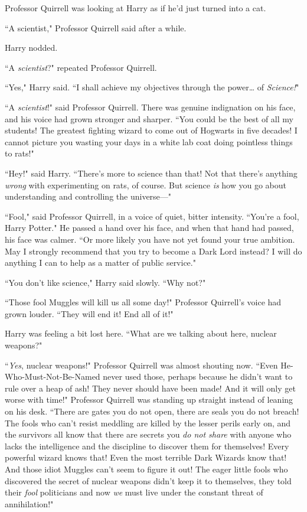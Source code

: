 Professor Quirrell was looking at Harry as if he'd just turned into a cat.

``A scientist," Professor Quirrell said after a while.

Harry nodded.

``A \emph{scientist}?" repeated Professor Quirrell.

``Yes," Harry said. ``I shall achieve my objectives through the power{\ldots} of \emph{Science!}"

``A \emph{scientist}!" said Professor Quirrell. There was genuine indignation on his face, and his voice had grown stronger and sharper. ``You could be the best of all my students! The greatest fighting wizard to come out of Hogwarts in five decades! I cannot picture you wasting your days in a white lab coat doing pointless things to rats!"

``Hey!" said Harry. ``There's more to science than that! Not that there's anything \emph{wrong} with experimenting on rats, of course. But science \emph{is} how you go about understanding and controlling the universe—"

``Fool," said Professor Quirrell, in a voice of quiet, bitter intensity. ``You're a fool, Harry Potter." He passed a hand over his face, and when that hand had passed, his face was calmer. ``Or more likely you have not yet found your true ambition. May I strongly recommend that you try to become a Dark Lord instead? I will do anything I can to help as a matter of public service."

``You don't like science," Harry said slowly. ``Why not?"

``Those fool Muggles will kill us all some day!" Professor Quirrell's voice had grown louder. ``They will end it! End all of it!"

Harry was feeling a bit lost here. ``What are we talking about here, nuclear weapons?"

``\emph{Yes}, nuclear weapons!" Professor Quirrell was almost shouting now. ``Even He-Who-Must-Not-Be-Named never used those, perhaps because he didn't want to rule over a heap of ash! They never should have been made! And it will only get worse with time!" Professor Quirrell was standing up straight instead of leaning on his desk. ``There are gates you do not open, there are seals you do not breach! The fools who can't resist meddling are killed by the lesser perils early on, and the survivors all know that there are secrets you \emph{do not share} with anyone who lacks the intelligence and the discipline to discover them for themselves! Every powerful wizard knows that! Even the most terrible Dark Wizards know that! And those idiot Muggles can't seem to figure it out! The eager little fools who discovered the secret of nuclear weapons didn't keep it to themselves, they told their \emph{fool} politicians and now \emph{we} must live under the constant threat of annihilation!"

